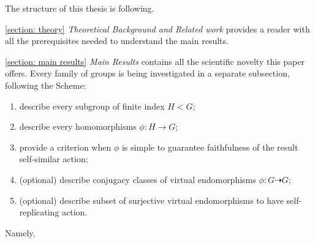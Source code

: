 \documentclass[a4paper,12pt]{amsart}
\theoremstyle{definition}
\begin{document}
	The structure of this thesis is following. 
	
	\ref{section: theory} \textit{Theoretical Background and Related work} provides a reader with all the prerequisites needed to understand the main results.  
		
	\ref{section: main results} \textit{Main Results} contains all the scientific novelty this paper offers. Every family of groups is being investigated in a separate subsection, following the Scheme:
	
	\begin{enumerate}[label=\arabic*.]
		\item describe every subgroup of finite index $H < G$; 
		\item describe every homomorphisms $\phi : H \rightarrow G$;
		\item provide a criterion when $\phi$ is simple to guarantee faithfulness of the result self-similar action;
		\item (optional) describe conjugacy classes of virtual endomorphisms $\phi: G \dashrightarrow G$;
		\item (optional) describe subset of surjective virtual endomorphisms to have self-replicating action.
	\end{enumerate}
	
	
	
	
	Namely, 
	
\end{document}
